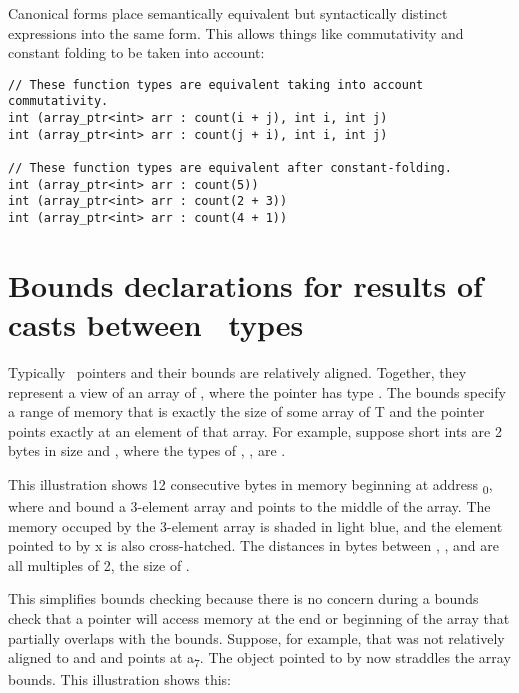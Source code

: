 Canonical forms place semantically equivalent but syntactically distinct
expressions into the same form.  This allows things like commutativity and constant
folding to be taken into account:
\begin{lstlisting}
// These function types are equivalent taking into account commutativity.
int (array_ptr<int> arr : count(i + j), int i, int j)
int (array_ptr<int> arr : count(j + i), int i, int j)

// These function types are equivalent after constant-folding.
int (array_ptr<int> arr : count(5))
int (array_ptr<int> arr : count(2 + 3))
int (array_ptr<int> arr : count(4 + 1))
\end{lstlisting}

\section{Bounds declarations for results of casts between \plainarrayptr\ types}
\label{section:pointer-cast-results}

Typically \arrayptr\ pointers and their bounds are relatively
aligned. Together, they represent a view of an array of , where
the pointer has type
\arrayptrT. The
bounds specify a range of memory that is exactly the size of some array
of T and the pointer points exactly at an element of that array. For
example, suppose short ints are 2 bytes in size and 
{}, where the types of ,
,  are  .

This illustration shows 12 consecutive bytes in memory beginning at
address \textsubscript{0}, where  and  bound a
3-element array and  points to the middle of the array. The
memory occuped by the 3-element array is shaded in light blue, and the
element pointed to by x is also cross-hatched. The distances in bytes
between , , and  are all multiples of 2,
the size of .
\begin{center}
\end{center}

This simplifies bounds checking because there is no concern during a
bounds check that a pointer will access memory at the end or beginning
of the array that partially overlaps with the bounds. Suppose, for
example, that  was not relatively aligned to  and
 and points at a\textsubscript{7}. The object pointed to by
 now straddles the array bounds. This illustration shows this:
\begin{center}
\end{center}

